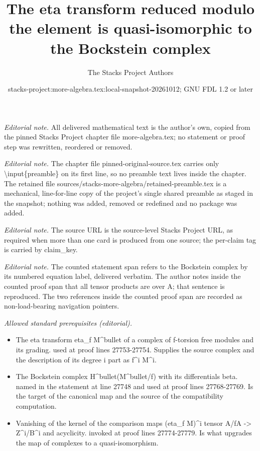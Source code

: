\documentclass[10pt,a4paper]{amsart}
\title{The eta transform reduced modulo the element is quasi-isomorphic to the Bockstein complex}
\author{The Stacks Project Authors}
\date{stacks-project:more-algebra.tex:local-snapshot-20261012; GNU FDL 1.2 or later}
\theoremstyle{plain}
\theoremstyle{definition}
\theoremstyle{remark}
\numberwithin{equation}{subsection}
\begin{document}
\maketitle
\setcounter{subsection}{1}
\noindent\textit{Editorial note.} All delivered mathematical text is the author's own, copied from the pinned Stacks Project chapter file more-algebra.tex; no statement or proof step was rewritten, reordered or removed.\par\medskip
\noindent\textit{Editorial note.} The chapter file pinned-original-source.tex carries only \textbackslash{}input\{preamble\} on its first line, so no preamble text lives inside the chapter. The retained file sources/stacks-more-algebra/retained-preamble.tex is a mechanical, line-for-line copy of the project's single shared preamble as staged in the snapshot; nothing was added, removed or redefined and no package was added.\par\medskip
\noindent\textit{Editorial note.} The source URL is the source-level Stacks Project URL, as required when more than one card is produced from one source; the per-claim tag is carried by claim\_key.\par\medskip
\noindent\textit{Editorial note.} The counted statement span refers to the Bockstein complex by its numbered equation label, delivered verbatim. The author notes inside the counted proof span that all tensor products are over A; that sentence is reproduced. The two references inside the counted proof span are recorded as non-load-bearing navigation pointers.\par\medskip
\noindent\textit{Allowed standard prerequisites (editorial).}\begin{itemize}
\item The eta transform eta\_f M\textasciicircum{}bullet of a complex of f-torsion free modules and its grading. used at proof lines 27753-27754. Supplies the source complex and the description of its degree i part as f\textasciicircum{}i M\textasciicircum{}i.
\item The Bockstein complex H\textasciicircum{}bullet(M\textasciicircum{}bullet/f) with its differentials beta. named in the statement at line 27748 and used at proof lines 27768-27769. Is the target of the canonical map and the source of the compatibility computation.
\item Vanishing of the kernel of the comparison maps (eta\_f M)\textasciicircum{}i tensor A/fA -> Z\textasciicircum{}i/B\textasciicircum{}i and acyclicity. invoked at proof lines 27774-27779. Is what upgrades the map of complexes to a quasi-isomorphism.
\end{itemize}\medskip
\end{document}
